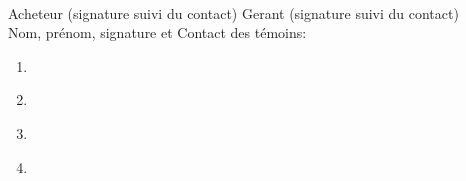 \documentclass[12pt]{article}
\begin{document}
\underline{\hspace{5cm}} \hspace{5cm} \underline{\hspace{5cm}} \\
Acheteur (signature suivi du contact) \hspace{3cm} Gerant (signature suivi du contact) \\
Nom, prénom, signature et Contact des témoins: 
\begin{enumerate}
	\item \underline{\hspace{10cm}}
	\item \underline{\hspace{10cm}}
	\item \underline{\hspace{10cm}}
	\item \underline{\hspace{10cm}}
\end{enumerate}
\end{document}
